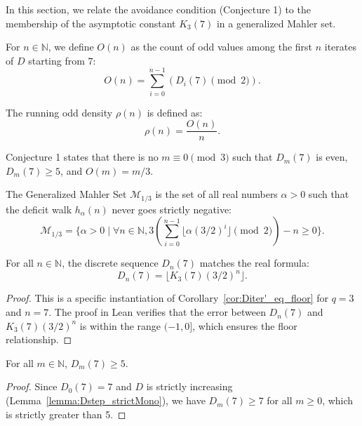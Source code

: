 \label{sec:mahler}

In this section, we relate the avoidance condition (Conjecture 1) to the membership of the asymptotic constant $K_3(7)$ in a generalized Mahler set.

\begin{definition}
  \label{def:OddCount}
  \leanok
  For $n \in \mathbb{N}$, we define $O(n)$ as the count of odd values among the first $n$ iterates of $D$ starting from $7$:
  \[ O(n) = \sum_{i=0}^{n-1} (D_i(7) \pmod 2). \]
\end{definition}

\begin{definition}
  \label{def:oddDensity}
  \leanok
  The running odd density $\rho(n)$ is defined as:
  \[ \rho(n) = \frac{O(n)}{n}. \]
\end{definition}

\begin{definition}
  \label{def:Conj1}
  \leanok
  Conjecture 1 states that there is no $m \equiv 0 \pmod 3$ such that $D_m(7)$ is even, $D_m(7) \ge 5$, and $O(m) = m/3$.
\end{definition}

\begin{definition}
  \label{def:M_1_3}
  \leanok
  The Generalized Mahler Set $\mathcal{M}_{1/3}$ is the set of all real numbers $\alpha > 0$ such that the deficit walk $h_\alpha(n)$ never goes strictly negative:
  \[ \mathcal{M}_{1/3} = \{ \alpha > 0 \mid \forall n \in \mathbb{N}, 3 \left( \sum_{i=0}^{n-1} \lfloor \alpha (3/2)^i \rfloor \pmod 2 \right) - n \ge 0 \}. \]
\end{definition}

\begin{lemma}
  \label{lemma:Diter_eq_real_formula}
  \leanok
  For all $n \in \mathbb{N}$, the discrete sequence $D_n(7)$ matches the real formula:
  \[ D_n(7) = \lfloor K_3(7) (3/2)^n \rfloor. \]
  \begin{proof}
    \leanok
    This is a specific instantiation of Corollary~\ref{cor:Diter'_eq_floor} for $q=3$ and $n=7$.
    The proof in Lean verifies that the error between $D_n(7)$ and $K_3(7)(3/2)^n$ is within the range $(-1, 0]$, which ensures the floor relationship.
  \end{proof}
\end{lemma}

\begin{lemma}
  \label{lemma:Diter_7_ge_5}
  \leanok
  For all $m \in \mathbb{N}$, $D_m(7) \ge 5$.
  \begin{proof}
    \leanok
    Since $D_0(7) = 7$ and $D$ is strictly increasing (Lemma~\ref{lemma:Dstep_strictMono}), we have $D_m(7) \ge 7$ for all $m \ge 0$, which is strictly greater than 5.
  \end{proof}
\end{lemma}

